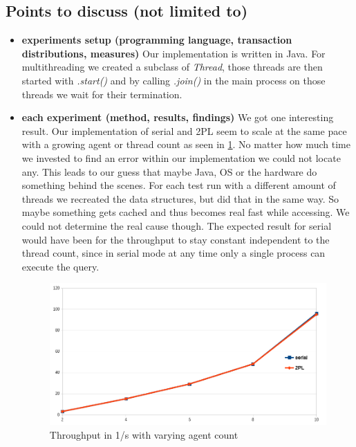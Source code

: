 \documentclass{vldb}
\begin{document}
\subsection{Points to discuss (not limited to)}
\begin{itemize}
\item \textbf{experiments setup (programming language, transaction distributions, measures)} Our implementation is written in Java. For multithreading we created a subclass of \textit{Thread}, those threads are then started with \textit{.start()} and by calling \textit{.join()} in the main process on those threads we wait for their termination.
\item \textbf{each experiment (method, results, findings)} We got one interesting result. Our implementation of serial and 2PL seem to scale at the same pace with a growing agent or thread count as seen in \ref{impact}. No matter how much time we invested to find an error within our implementation we could not locate any. This leads to our guess that maybe Java, OS or the hardware do something behind the scenes. For each test run with a different amount of threads we recreated the data structures, but did that in the same way. So maybe something gets cached and thus becomes real fast while accessing. We could not determine the real cause though. The expected result for serial would have been for the throughput to stay constant independent to the thread count, since in serial mode at any time only a single process can execute the query.
\begin{figure}[H]
	\centering
	\includegraphics[width=.46\textwidth]{impact.png}
	\caption{Throughput in 1/s with varying agent count}
	\label{impact}
\end{figure}
\end{itemize}
\end{document}
